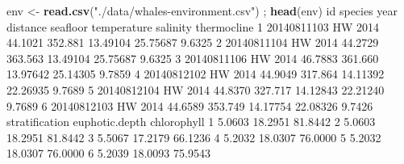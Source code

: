 \documentclass[
]{book}
\newenvironment{Shaded}{\begin{snugshade}}{\end{snugshade}}
\newcommand{\DecValTok}[1]{\textcolor[rgb]{0.00,0.00,0.81}{#1}}
\newcommand{\FloatTok}[1]{\textcolor[rgb]{0.00,0.00,0.81}{#1}}
\newcommand{\KeywordTok}[1]{\textcolor[rgb]{0.13,0.29,0.53}{\textbf{#1}}}
\newcommand{\NormalTok}[1]{#1}
\newcommand{\StringTok}[1]{\textcolor[rgb]{0.31,0.60,0.02}{#1}}
\begin{document}
\begin{Shaded}
\begin{Highlighting}[]
\NormalTok{env <-}\StringTok{ }\KeywordTok{read.csv}\NormalTok{(}\StringTok{"./data/whales-environment.csv"}\NormalTok{) ; }\KeywordTok{head}\NormalTok{(env)}
\NormalTok{           id species year distance seafloor temperature salinity thermocline}
\DecValTok{1} \DecValTok{20140811103}\NormalTok{      HW }\DecValTok{2014}  \FloatTok{44.1021}  \FloatTok{352.881}    \FloatTok{13.49104} \FloatTok{25.75687}      \FloatTok{9.6325}
\DecValTok{2} \DecValTok{20140811104}\NormalTok{      HW }\DecValTok{2014}  \FloatTok{44.2729}  \FloatTok{363.563}    \FloatTok{13.49104} \FloatTok{25.75687}      \FloatTok{9.6325}
\DecValTok{3} \DecValTok{20140811106}\NormalTok{      HW }\DecValTok{2014}  \FloatTok{46.7883}  \FloatTok{361.660}    \FloatTok{13.97642} \FloatTok{25.14305}      \FloatTok{9.7859}
\DecValTok{4} \DecValTok{20140812102}\NormalTok{      HW }\DecValTok{2014}  \FloatTok{44.9049}  \FloatTok{317.864}    \FloatTok{14.11392} \FloatTok{22.26935}      \FloatTok{9.7689}
\DecValTok{5} \DecValTok{20140812104}\NormalTok{      HW }\DecValTok{2014}  \FloatTok{44.8370}  \FloatTok{327.717}    \FloatTok{14.12843} \FloatTok{22.21240}      \FloatTok{9.7689}
\DecValTok{6} \DecValTok{20140812103}\NormalTok{      HW }\DecValTok{2014}  \FloatTok{44.6589}  \FloatTok{353.749}    \FloatTok{14.17754} \FloatTok{22.08326}      \FloatTok{9.7426}
\NormalTok{  stratification euphotic.depth chlorophyll}
\DecValTok{1}         \FloatTok{5.0603}        \FloatTok{18.2951}     \FloatTok{81.8442}
\DecValTok{2}         \FloatTok{5.0603}        \FloatTok{18.2951}     \FloatTok{81.8442}
\DecValTok{3}         \FloatTok{5.5067}        \FloatTok{17.2179}     \FloatTok{66.1236}
\DecValTok{4}         \FloatTok{5.2032}        \FloatTok{18.0307}     \FloatTok{76.0000}
\DecValTok{5}         \FloatTok{5.2032}        \FloatTok{18.0307}     \FloatTok{76.0000}
\DecValTok{6}         \FloatTok{5.2039}        \FloatTok{18.0093}     \FloatTok{75.9543}


\end{Highlighting}
\end{Shaded}
\end{document}
